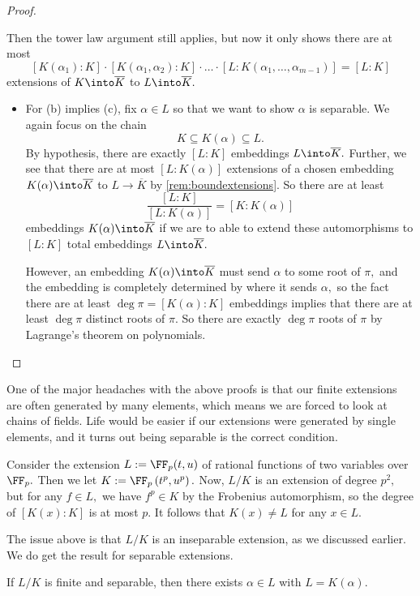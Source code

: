 \begin{proof}
\begin{remark}
		Then the tower law argument still applies, but now it only shows there are at most
		\[[K(\alpha_1):K]\cdot[K(\alpha_1,\alpha_2):K]\cdot\ldots\cdot[L:K(\alpha_1,\ldots,\alpha_{m-1})]=[L:K]\]
		extensions of $K\into\overline K$ to $L\into\overline K.$
	\end{remark}
	\begin{itemize}
		\item For (b) implies (c), fix $\alpha\in L$ so that we want to show $\alpha$ is separable. We again focus on the chain
		\[K\subseteq K(\alpha)\subseteq L.\]
		By hypothesis, there are exactly $[L:K]$ embeddings $L\into\overline K.$ Further, we see that there are at most $[L:K(\alpha)]$ extensions of a chosen embedding $K(\alpha)\into\overline K$ to $L\to\overline K$ by \autoref{rem:boundextensions}. So there are at least
		\[\frac{[L:K]}{[L:K(\alpha)]}=[K:K(\alpha)]\]
		embeddings $K(\alpha)\into\overline K$ if we are to able to extend these automorphisms to $[L:K]$ total embeddings $L\into\overline K.$
		
		However, an embedding $K(\alpha)\into\overline K$ must send $\alpha$ to some root of $\pi,$ and the embedding is completely determined by where it sends $\alpha,$ so the fact there are at least $\deg\pi=[K(\alpha):K]$ embeddings implies that there are at least $\deg\pi$ distinct roots of $\pi.$ So there are exactly $\deg\pi$ roots of $\pi$ by Lagrange's theorem on polynomials.
		\qedhere
	\end{itemize}
\end{proof}
One of the major headaches with the above proofs is that our finite extensions are often generated by many elements, which means we are forced to look at chains of fields. Life would be easier if our extensions were generated by single elements, and it turns out being separable is the correct condition.
\begin{nex}
	Consider the extension $L:=\FF_p(t,u)$ of rational functions of two variables over $\FF_p.$ Then we let $K:=\FF_p\left(t^p,u^p\right).$ Now, $L/K$ is an extension of degree $p^2,$ but for any $f\in L,$ we have $f^p\in K$ by the Frobenius automorphism, so the degree of $[K(x):K]$ is at most $p.$ It follows that $K(x)\ne L$ for any $x\in L.$
\end{nex}
The issue above is that $L/K$ is an inseparable extension, as we discussed earlier. We do get the result for separable extensions.
\begin{theorem}
	If $L/K$ is finite and separable, then there exists $\alpha\in L$ with $L=K(\alpha).$
\end{theorem}
